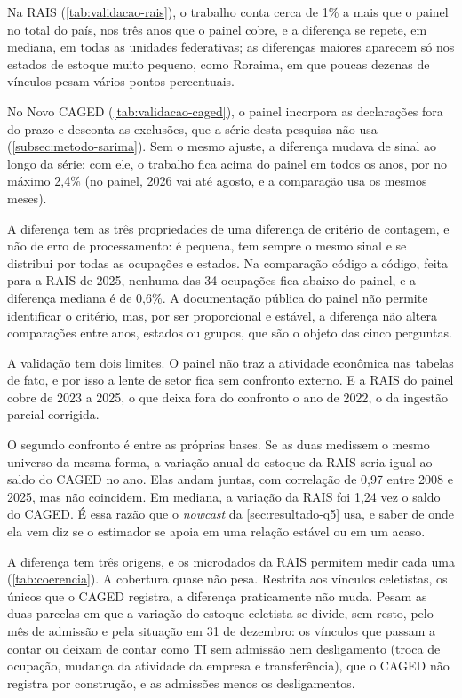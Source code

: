 

Na RAIS (\autoref{tab:validacao-rais}), o trabalho conta cerca de 1\% a mais que o painel no total do país, nos três anos que o painel cobre, e a diferença se repete, em mediana, em todas as unidades federativas; as diferenças maiores aparecem só nos estados de estoque muito pequeno, como Roraima, em que poucas dezenas de vínculos pesam vários pontos percentuais.



No Novo CAGED (\autoref{tab:validacao-caged}), o painel incorpora as declarações fora do prazo e desconta as exclusões, que a série desta pesquisa não usa (\autoref{subsec:metodo-sarima}). Sem o mesmo ajuste, a diferença mudava de sinal ao longo da série; com ele, o trabalho fica acima do painel em todos os anos, por no máximo 2,4\% (no painel, 2026 vai até agosto, e a comparação usa os mesmos meses).

A diferença tem as três propriedades de uma diferença de critério de contagem, e não de erro de processamento: é pequena, tem sempre o mesmo sinal e se distribui por todas as ocupações e estados. Na comparação código a código, feita para a RAIS de 2025, nenhuma das 34 ocupações fica abaixo do painel, e a diferença mediana é de 0,6\%. A documentação pública do painel não permite identificar o critério, mas, por ser proporcional e estável, a diferença não altera comparações entre anos, estados ou grupos, que são o objeto das cinco perguntas.

A validação tem dois limites. O painel não traz a atividade econômica nas tabelas de fato, e por isso a lente de setor fica sem confronto externo. E a RAIS do painel cobre de 2023 a 2025, o que deixa fora do confronto o ano de 2022, o da ingestão parcial corrigida.

O segundo confronto é entre as próprias bases. Se as duas medissem o mesmo universo da mesma forma, a variação anual do estoque da RAIS seria igual ao saldo do CAGED no ano. Elas andam juntas, com correlação de 0,97 entre 2008 e 2025, mas não coincidem. Em mediana, a variação da RAIS foi 1,24 vez o saldo do CAGED. É essa razão que o \textit{nowcast} da \autoref{sec:resultado-q5} usa, e saber de onde ela vem diz se o estimador se apoia em uma relação estável ou em um acaso.


A diferença tem três origens, e os microdados da RAIS permitem medir cada uma (\autoref{tab:coerencia}). A cobertura quase não pesa. Restrita aos vínculos celetistas, os únicos que o CAGED registra, a diferença praticamente não muda. Pesam as duas parcelas em que a variação do estoque celetista se divide, sem resto, pelo mês de admissão e pela situação em 31 de dezembro: os vínculos que passam a contar ou deixam de contar como TI sem admissão nem desligamento (troca de ocupação, mudança da atividade da empresa e transferência), que o CAGED não registra por construção, e as admissões menos os desligamentos.

